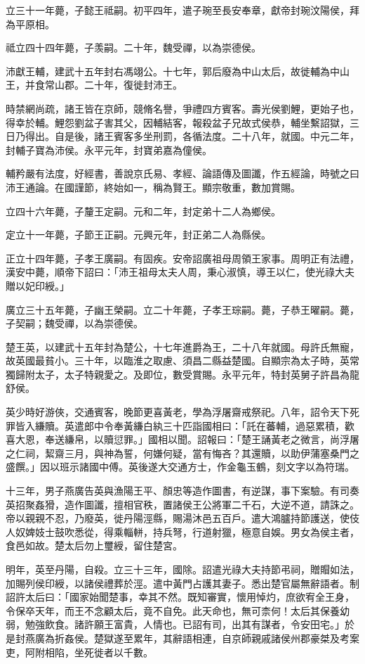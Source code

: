 \begin{pinyinscope}
立三十一年薨，子懿王祗嗣。初平四年，遣子琬至長安奉章，獻帝封琬汶陽侯，拜為平原相。

祗立四十四年薨，子羡嗣。二十年，魏受禪，以為崇德侯。

沛獻王輔，建武十五年封右馮翊公。十七年，郭后廢為中山太后，故徙輔為中山王，并食常山郡。二十年，復徙封沛王。

時禁網尚疏，諸王皆在京師，競脩名譽，爭禮四方賓客。壽光侯劉鯉，更始子也，得幸於輔。鯉怨劉盆子害其父，因輔結客，報殺盆子兄故式侯恭，輔坐繫詔獄，三日乃得出。自是後，諸王賓客多坐刑罰，各循法度。二十八年，就國。中元二年，封輔子寶為沛侯。永平元年，封寶弟嘉為僮侯。

輔矜嚴有法度，好經書，善說京氏易、孝經、論語傳及圖讖，作五經論，時號之曰沛王通論。在國謹節，終始如一，稱為賢王。顯宗敬重，數加賞賜。

立四十六年薨，子釐王定嗣。元和二年，封定弟十二人為鄉侯。

定立十一年薨，子節王正嗣。元興元年，封正弟二人為縣侯。

正立十四年薨，子孝王廣嗣。有固疾。安帝詔廣祖母周領王家事。周明正有法禮，漢安中薨，順帝下詔曰：「沛王祖母太夫人周，秉心淑慎，導王以仁，使光祿大夫贈以妃印綬。」

廣立三十五年薨，子幽王榮嗣。立二十年薨，子孝王琮嗣。薨，子恭王曜嗣。薨，子契嗣；魏受禪，以為崇德侯。

楚王英，以建武十五年封為楚公，十七年進爵為王，二十八年就國。母許氏無寵，故英國最貧小。三十年，以臨淮之取慮、須昌二縣益楚國。自顯宗為太子時，英常獨歸附太子，太子特親愛之。及即位，數受賞賜。永平元年，特封英舅子許昌為龍舒侯。

英少時好游俠，交通賓客，晚節更喜黃老，學為浮屠齋戒祭祀。八年，詔令天下死罪皆入縑贖。英遣郎中令奉黃縑白紈三十匹詣國相曰：「託在蕃輔，過惡累積，歡喜大恩，奉送縑帛，以贖愆罪。」國相以聞。詔報曰：「楚王誦黃老之微言，尚浮屠之仁祠，絜齋三月，與神為誓，何嫌何疑，當有悔吝？其還贖，以助伊蒲塞桑門之盛饌。」因以班示諸國中傅。英後遂大交通方士，作金龜玉鶴，刻文字以為符瑞。

十三年，男子燕廣告英與漁陽王平、顏忠等造作圖書，有逆謀，事下案驗。有司奏英招聚姦猾，造作圖讖，擅相官秩，置諸侯王公將軍二千石，大逆不道，請誅之。帝以親親不忍，乃廢英，徙丹陽涇縣，賜湯沐邑五百戶。遣大鴻臚持節護送，使伎人奴婢妓士鼓吹悉從，得乘輜軿，持兵弩，行道射獵，極意自娛。男女為侯主者，食邑如故。楚太后勿上璽綬，留住楚宮。

明年，英至丹陽，自殺。立三十三年，國除。詔遣光祿大夫持節弔祠，贈賵如法，加賜列侯印綬，以諸侯禮葬於涇。遣中黃門占護其妻子。悉出楚官屬無辭語者。制詔許太后曰：「國家始聞楚事，幸其不然。既知審實，懷用悼灼，庶欲宥全王身，令保卒天年，而王不念顧太后，竟不自免。此天命也，無可柰何！太后其保養幼弱，勉強飲食。諸許願王富貴，人情也。已詔有司，出其有謀者，令安田宅。」於是封燕廣為折姦侯。楚獄遂至累年，其辭語相連，自京師親戚諸侯州郡豪桀及考案吏，阿附相陷，坐死徙者以千數。


\end{pinyinscope}
